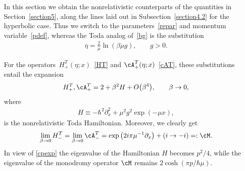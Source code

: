 \documentclass[pdftex]{sigma}
\numberwithin{equation}{section}
\begin{document}
In this section we obtain the nonrelativistic counterparts of the quantities in Section~\ref{section5}, along the lines laid out in Subsection~\ref{section4.2} for the hyperbolic case. Thus we switch to the parameters~\eqref{repar} and momentum variable~\eqref{pdef}, whereas the Toda analog of~\eqref{bg} is the substitution
\begin{gather}
\eta=\frac{2}{\mu}\ln (\beta\mu g),\qquad g>0.
\end{gather}

For the operators~$H^T_+(\eta;x)$~\eqref{HT} and $\cA^T_+(\eta;x)$~\eqref{cAT}, these substitutions entail the expansion
\begin{gather}\label{HcAp}
H^T_+,\cA^T_+= 2+ \beta^2 H +O\big(\beta^4\big),\qquad \beta \to 0,
\end{gather}
where
\begin{gather}
H\equiv -\hbar^2 \partial_x^2+ \mu^2g^2 \exp(-\mu x),
\end{gather}
is the nonrelativistic Toda Hamiltonian. Moreover, we clearly get
\begin{gather}\label{HcAm}
\lim_{\beta \to 0}H^T_-=\lim_{\beta \to 0}\cA^T_-=
\exp\big(2i\pi\mu^{-1}\partial_x\big) +(i\to -i)=:\cM.
\end{gather}
In view of \eqref{cpexp} the eigenvalue of the Hamiltonian $H$ becomes $p^2/4$, while the eigenvalue of the monodromy operator $\cM$ remains $2\cosh(\pi p/\hbar\mu)$.
\end{document}
